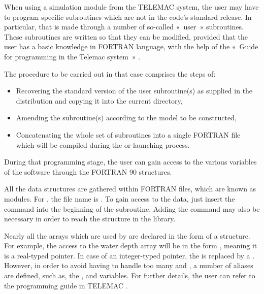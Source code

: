 When using a simulation module from the TELEMAC system, the user may have to
program specific subroutines which are not in the code's standard release. In
particular, that is made through a number of so-called «~user~» subroutines.
These subroutines are written so that they can be modified, provided that the
user has a basic knowledge in FORTRAN language, with the help of the «~Guide
for programming in the Telemac system~» \cite{HervouetProg2009}.

The procedure to be carried out in that case comprises the steps of:

\begin{itemize}
\item Recovering the standard version of the user subroutine(s) as supplied in
the distribution and copying it into the current directory,
\item Amending the subroutine(s) according to the model to be constructed,
\item Concatenating the whole set of subroutines into a single FORTRAN file
which will be compiled during the  or  launching process.
\end{itemize}

During that programming stage, the user can gain access to the various
variables of the software through the FORTRAN 90 structures.

All the data structures are gathered within FORTRAN files, which are known as
modules. For \waqtel, the file name is . To gain
access to the \waqtel data, just insert the command  into the beginning of the subroutine. Adding the
command  may also be necessary in order to reach the structure in the
\bief library.

Nearly all the arrays which are used by \waqtel are declared in the form of
a structure. For example, the access to the water depth array will be in the
form ,  meaning it is a real-typed pointer.
In case of an integer-typed pointer, the  is replaced by a .
However, in order to avoid having to handle too many  and ,
a number of aliases are defined, such as, the ,  and
 variables. For further details, the user can refer to
the programming guide in TELEMAC \cite{HervouetProg2009}.
